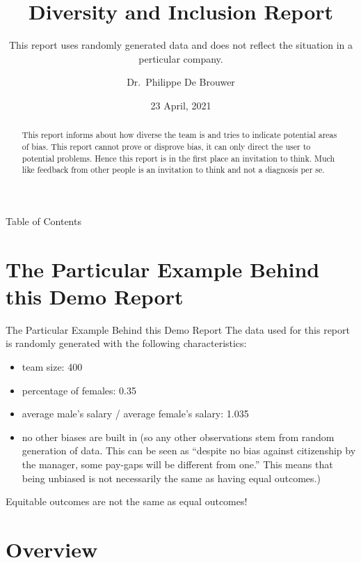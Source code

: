 \documentclass[
  ignorenonframetext,
  usenames,
  dvipsnames]{beamer}
\title{Diversity and Inclusion Report}
\subtitle{This report uses randomly generated data and does not reflect
the situation in a perticular company.}
\author{Dr.~Philippe De Brouwer}
\date{23 April, 2021}
\providecommand{\tightlist}{%
  \setlength{\itemsep}{0pt}\setlength{\parskip}{0pt}}
\begin{document}
\frame{\titlepage}
\begin{abstract}
This report informs about how diverse the team is and tries to indicate
potential areas of bias. This report cannot prove or disprove bias, it
can only direct the user to potential problems. Hence this report is in
the first place an invitation to think. Much like feedback from other
people is an invitation to think and not a diagnosis per se.
\end{abstract}

\begin{frame}{Table of Contents}
\protect\hypertarget{table-of-contents}{}
\tableofcontents[hideallsubsections]
\end{frame}

\hypertarget{the-particular-example-behind-this-demo-report}{%
\section{The Particular Example Behind this Demo
Report}\label{the-particular-example-behind-this-demo-report}}

\begin{frame}{The Particular Example Behind this Demo Report}
The data used for this report is randomly generated with the following
characteristics:

\begin{itemize}
\tightlist
\item
  team size: 400
\item
  percentage of females: 0.35
\item
  average male's salary / average female's salary: 1.035
\item
  no other biases are built in (so any other observations stem from
  random generation of data. This can be seen as ``despite no bias
  against citizenship by the manager, some pay-gaps will be different
  from one.'' This means that being unbiased is not necessarily the same
  as having equal outcomes.)
\end{itemize}

\begin{block}{Equitable outcomes are not the same as equal outcomes!}
\protect\hypertarget{equitable-outcomes-are-not-the-same-as-equal-outcomes}{}
\end{block}
\end{frame}

\hypertarget{overview}{%
\section{Overview}\label{overview}}
\end{document}
